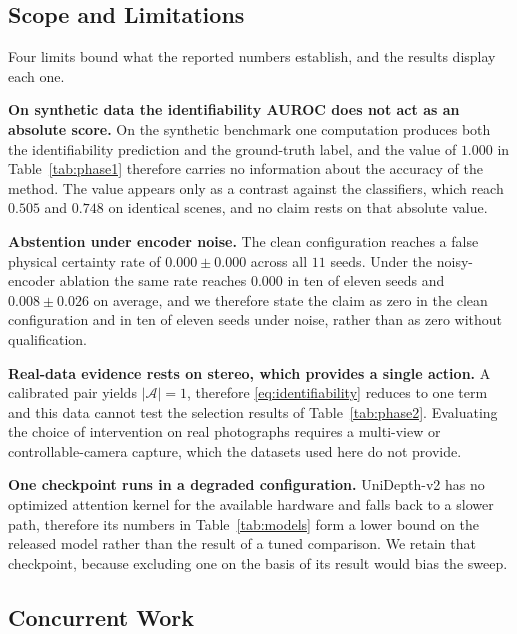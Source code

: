 \documentclass{article} %
\theoremstyle{defstyle}
\theoremstyle{plain}
\begin{document}
\subsection{Scope and Limitations}
\label{sec:supp-limits}

Four limits bound what the reported numbers establish, and the results display each one.

\textbf{On synthetic data the identifiability AUROC does not act as an absolute score.} On
the synthetic benchmark one computation produces both the identifiability prediction and the
ground-truth label, and the value of $1.000$ in Table~\ref{tab:phase1} therefore carries no
information about the accuracy of the method. The value appears only as a contrast against
the classifiers, which reach $0.505$ and $0.748$ on identical scenes, and no claim rests on
that absolute value.

\textbf{Abstention under encoder noise.} The clean configuration reaches a false physical
certainty rate of $0.000 \pm 0.000$ across all $11$ seeds. Under the noisy-encoder ablation
the same rate reaches $0.000$ in ten of eleven seeds and $0.008 \pm 0.026$ on average, and we
therefore state the claim as zero in the clean configuration and in ten of eleven seeds under
noise, rather than as zero without qualification.

\textbf{Real-data evidence rests on stereo, which provides a single action.} A calibrated
pair yields $|\mathcal{A}| = 1$, therefore \eqref{eq:identifiability} reduces to one term and
this data cannot test the selection results of Table~\ref{tab:phase2}. Evaluating the choice
of intervention on real photographs requires a multi-view or controllable-camera capture,
which the datasets used here do not provide.

\textbf{One checkpoint runs in a degraded configuration.} UniDepth-v2 has no optimized
attention kernel for the available hardware and falls back to a slower path, therefore its
numbers in Table~\ref{tab:models} form a lower bound on the released model rather than the
result of a tuned comparison. We retain that checkpoint, because excluding one on the basis of its result
would bias the sweep.

\subsection{Concurrent Work}
\label{sec:supp-concurrent}
\end{document}
